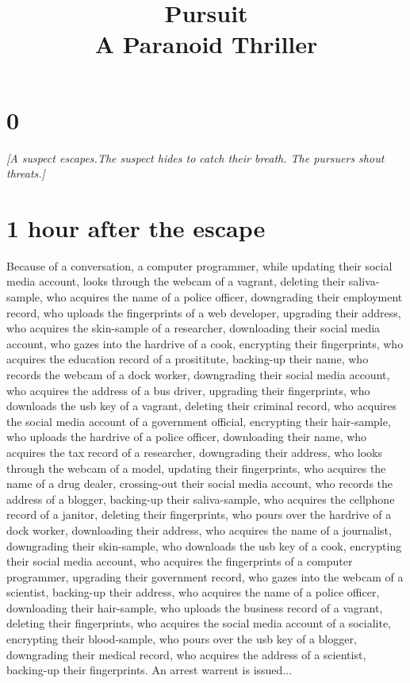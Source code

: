 \documentclass{report}
\title{Pursuit\\A Paranoid Thriller}
\date{}
\begin{document}
\maketitle
\section*{0}\textit{[A suspect escapes.The suspect hides to catch their breath. The pursuers shout threats.]}\section*{1 \small{hour after the escape}}

Because of a conversation, a computer programmer, while updating their social media account, looks through the webcam of a vagrant, deleting their saliva-sample, who acquires the name of a police officer, downgrading their employment record, who uploads the fingerprints of a web developer, upgrading their address, who acquires the skin-sample of a researcher, downloading their social media account, who gazes into the hardrive of a cook, encrypting their fingerprints, who acquires the education record of a prosititute, backing-up their name, who records the webcam of a dock worker, downgrading their social media account, who acquires the address of a bus driver, upgrading their fingerprints, who downloads the usb key of a vagrant, deleting their criminal record, who acquires the social media account of a government official, encrypting their hair-sample, who uploads the hardrive of a police officer, downloading their name, who acquires the tax record of a researcher, downgrading their address, who looks through the webcam of a model, updating their fingerprints, who acquires the name of a drug dealer, crossing-out their social media account, who records the address of a blogger, backing-up their saliva-sample, who acquires the cellphone record of a janitor, deleting their fingerprints, who pours over the hardrive of a dock worker, downloading their address, who acquires the name of a journalist, downgrading their skin-sample, who downloads the usb key of a cook, encrypting their social media account, who acquires the fingerprints of a computer programmer, upgrading their government record, who gazes into the webcam of a scientist, backing-up their address, who acquires the name of a police officer, downloading their hair-sample, who uploads the business record of a vagrant, deleting their fingerprints, who acquires the social media account of a socialite, encrypting their blood-sample, who pours over the usb key of a blogger, downgrading their medical record, who acquires the address of a scientist, backing-up their fingerprints. An arrest warrent is issued...
\end{document}

